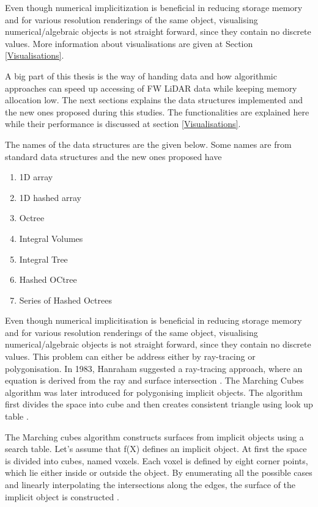 \documentclass{subfiles}
\begin{document}
Even though numerical implicitization is beneficial in reducing storage memory and for various resolution renderings of the same object, visualising numerical/algebraic objects is not straight forward, since they contain no discrete values. More information about visualisations are given at Section \ref{Visualisations}. 

A big part of this thesis is the way of handing data and how algorithmic approaches can speed up accessing of FW LiDAR data while keeping memory allocation low. The next sections explains the data structures implemented and the new ones proposed during this studies. The functionalities are explained here while their performance is discussed at section \ref{Visualisations}. 

The names of the data structures are the given below. Some names are from standard data structures and the new ones proposed have 
\begin{enumerate}[noitemsep]
	\item 1D array
	\item 1D hashed array
	\item Octree
	\item Integral Volumes
	\item Integral Tree
	\item Hashed OCtree
	\item Series of Hashed Octrees
\end{enumerate} 
	
	
Even though numerical implicitisation is beneficial in reducing storage memory and for various resolution renderings of the same object, visualising numerical/algebraic objects is not straight forward, since they contain no discrete values. This problem can either be address either by ray-tracing or polygonisation. In 1983, Hanraham suggested a ray-tracing approach, where an equation is derived from the ray and surface intersection \cite{Hanrahan1983}.  The Marching Cubes algorithm was later introduced for polygonising implicit objects. The algorithm first divides the space into cube and then creates consistent triangle using look up table \cite{Lorensen1987}. \newline\newline

The Marching cubes algorithm constructs surfaces from implicit objects using a search table. Let’s assume that f(X) defines an implicit object. At first the space is divided into cubes, named voxels. Each voxel is defined by eight corner points, which lie either inside or outside the object. By enumerating all the possible cases and linearly interpolating the intersections along the edges, the surface of the implicit object is constructed \cite{Lorensen1987}.\newline\newline
\end{document}
